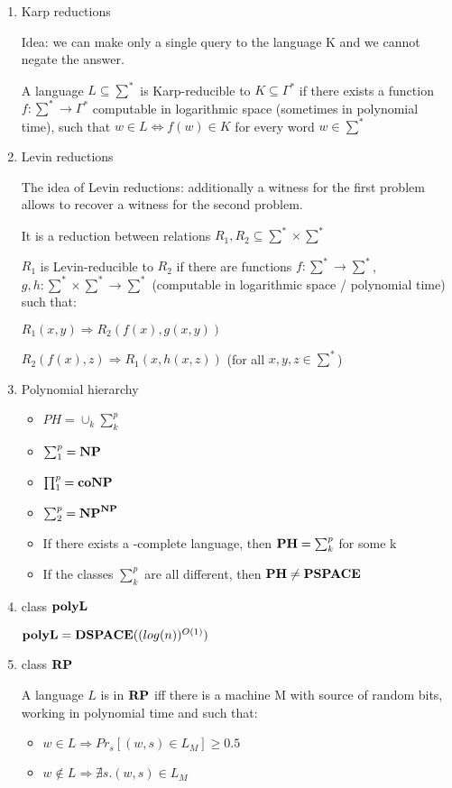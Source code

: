 \begin{enumerate}
    
    \item Karp reductions
    
    Idea: we can make only a single query to the language K and we cannot negate the answer.
    
    A language $L \subseteq \sum^*$ is Karp-reducible to $K \subseteq \Gamma^*$ if there exists a function $f:\sum^* \rightarrow \Gamma^*$ computable in logarithmic space (sometimes in polynomial time), such that $w \in L \iff f(w) \in K$ for every word $w \in \sum^*$
    
    \item Levin reductions
    
    The idea of Levin reductions: additionally a witness for the first problem allows to recover a witness for the second problem.
    
    It is a reduction between relations $R_1, R_2 \subseteq \sum^* \times \sum^*$
    
    $R_1$ is Levin-reducible to $R_2$ if there are functions $f:\sum^* \rightarrow \sum^*$, $g,h:\sum^* \times \sum^* \rightarrow \sum^*$  (computable in logarithmic space / polynomial time) such that:
    
    $R_1(x,y) \Rightarrow R_2(f(x), g(x,y))$
    
    $R_2(f(x),z) \Rightarrow R_1(x, h(x,z))$ (for all $x,y,z \in \sum^*$)
    
    \item Polynomial hierarchy
    \begin{itemize}
        \item $PH = \cup_k \sum_k^p$
        \item $\sum_1^p= \textbf{NP}$
        \item $\prod_1^p= \textbf{co}\textbf{NP}$
        \item $\sum_2^p= \textbf{NP}^{\textbf{NP}}$
        \item If there exists a \PH-complete language, then $\textbf{PH} = \sum_k^p$ for some k
        \item If the classes $\sum_k^p$ are all different, then $\textbf{PH} \neq \textbf{PSPACE}$
    \end{itemize}
    
    \item class $\textbf{polyL}$
    
     $\textbf{polyL} = \textbf{DSPACE}((log (n))^{O(1)})$
    
    \item class $\textbf{RP}$
    
    A language $L$ is in $\textbf{RP}$ iff there is a machine M with source of random bits, working in polynomial time and such that:
    \begin{itemize}
        \item $w \in L \Rightarrow Pr_s[(w,s) \in L_M] \geq 0.5$
        \item $w \notin L \Rightarrow \nexists s. (w,s) \in L_M$
    \end{itemize}
    

\end{enumerate}
